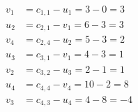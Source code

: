 \[
\begin{aligned}
v_{1} &= c_{1,1} - u_{1} = 3 - 0 = 3 \\
u_{2} &= c_{2,1} - v_{1} = 6 - 3 = 3 \\
v_{4} &= c_{2,4} - u_{2} = 5 - 3 = 2 \\
u_{3} &= c_{3,1} - v_{1} = 4 - 3 = 1 \\
v_{2} &= c_{3,2} - u_{3} = 2 - 1 = 1 \\
u_{4} &= c_{4,4} - v_{4} = 10 - 2 = 8 \\
v_{3} &= c_{4,3} - u_{4} = 4 - 8 = -4 \\
\end{aligned}
\]

